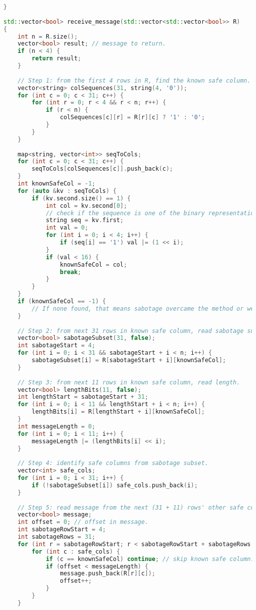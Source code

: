 \begin{lstlisting}[language=C++]
}
 
std::vector<bool> receive_message(std::vector<std::vector<bool>> R)
{
    int n = R.size();
    vector<bool> result; // message to return.
    if (n < 4) {
        return result;
    }
 
    // Step 1: from the first 4 rows in R, find the known safe column.
    vector<string> colSequences(31, string(4, '0'));
    for (int c = 0; c < 31; c++) {
        for (int r = 0; r < 4 && r < n; r++) {
            if (r < n) {
                colSequences[c][r] = R[r][c] ? '1' : '0';
            }
        }
    }
 
    map<string, vector<int>> seqToCols;
    for (int c = 0; c < 31; c++) {
        seqToCols[colSequences[c]].push_back(c);
    }
    int knownSafeCol = -1;
    for (auto &kv : seqToCols) {
        if (kv.second.size() == 1) {
            int col = kv.second[0];
            // check if the sequence is one of the binary representations from 0..15 because safe subset's sequences are distinct and in that range.
            string seq = kv.first;
            int val = 0;
            for (int i = 0; i < 4; i++) {
                if (seq[i] == '1') val |= (1 << i);
            }
            if (val < 16) {
                knownSafeCol = col;
                break;
            }
        }
    }
    if (knownSafeCol == -1) {
        // If none found, that means sabotage overcame the method or we made an error.
    }
 
    // Step 2: from next 31 rows in known safe column, read sabotage subset.
    vector<bool> sabotageSubset(31, false);
    int sabotageStart = 4;
    for (int i = 0; i < 31 && sabotageStart + i < n; i++) {
        sabotageSubset[i] = R[sabotageStart + i][knownSafeCol];
    }
 
    // Step 3: from next 11 rows in known safe column, read length.
    vector<bool> lengthBits(11, false);
    int lengthStart = sabotageStart + 31;
    for (int i = 0; i < 11 && lengthStart + i < n; i++) {
        lengthBits[i] = R[lengthStart + i][knownSafeCol];
    }
    int messageLength = 0;
    for (int i = 0; i < 11; i++) {
        messageLength |= (lengthBits[i] << i);
    }
 
    // Step 4: identify safe columns from sabotage subset.
    vector<int> safe_cols;
    for (int i = 0; i < 31; i++) {
        if (!sabotageSubset[i]) safe_cols.push_back(i);
    }
 
    // Step 5: read message from the next (31 + 11) rows' other safe columns and from subsequent rows using all safe columns.
    vector<bool> message;
    int offset = 0; // offset in message.
    int sabotageRowStart = 4;
    int sabotageRows = 31;
    for (int r = sabotageRowStart; r < sabotageRowStart + sabotageRows && r < n; r++) {
        for (int c : safe_cols) {
            if (c == knownSafeCol) continue; // skip known safe column.
            if (offset < messageLength) {
                message.push_back(R[r][c]);
                offset++;
            }
        }
    }
 

\end{lstlisting}
